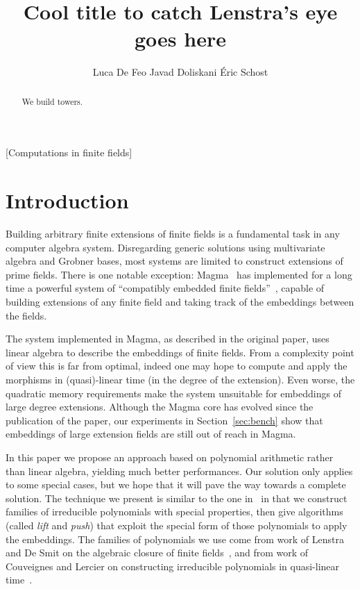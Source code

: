 \documentclass{sig-alternate}
\begin{document}
\title{Cool title to catch Lenstra's eye goes here}
\author{
  \alignauthor Luca De Feo
  \alignauthor Javad Doliskani
  \alignauthor Éric Schost
}

\maketitle
\begin{abstract}
  We build towers.
\end{abstract}
[Computations in finite fields]


\section{Introduction}
\label{sec:intro}

Building arbitrary finite extensions of finite fields is a fundamental
task in any computer algebra system. Disregarding generic solutions
using multivariate algebra and Grobner bases, most systems are limited
to construct extensions of prime fields. There is one notable
exception: Magma~\cite{MAGMA} has implemented for a long time a
powerful system of ``compatibly embedded finite
fields''~\cite{bosma+cannon+steel97}, capable of building extensions
of any finite field and taking track of the embeddings between the
fields.

The system implemented in Magma, as described in the original paper,
uses linear algebra to describe the embeddings of finite fields. From
a complexity point of view this is far from optimal, indeed one may
hope to compute and apply the morphisms in (quasi)-linear time (in the
degree of the extension). Even worse, the quadratic memory
requirements make the system unsuitable for embeddings of large degree
extensions. Although the Magma core has evolved since the publication
of the paper, our experiments in Section~\ref{sec:bench} show that
embeddings of large extension fields are still out of reach in Magma.

In this paper we propose an approach based on polynomial arithmetic
rather than linear algebra, yielding much better performances. Our
solution only applies to some special cases, but we hope that it will
pave the way towards a complete solution. The technique we present is
similar to the one in~\cite{df+schost12} in that we construct families
of irreducible polynomials with special properties, then give
algorithms (called \emph{lift} and \emph{push}) that exploit the
special form of those polynomials to apply the embeddings. The
families of polynomials we use come from work of Lenstra and De Smit
on the algebraic closure of finite
fields~\cite{lenstra+desmit08-stdmodels}, and from work of Couveignes
and Lercier on constructing irreducible polynomials in quasi-linear
time~\cite{couveignes+lercier11}.
\end{document}

